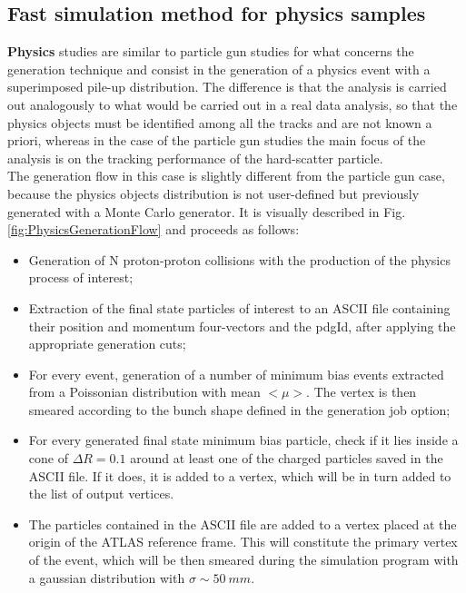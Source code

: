 \documentclass[a4paper,twoside,12pt]{article}
\begin{document}
\subsection{Fast simulation method for physics samples}\label{subsec:physicsSimulation}

\textbf{Physics} studies are similar to particle gun studies for what concerns the generation technique and 
consist in the generation of a physics event with a superimposed pile-up distribution. The
difference is that the analysis is carried out analogously to what would be carried out
in a real data analysis, so that the physics objects must be identified among all the tracks
and are not known a priori, whereas in the case of the particle gun studies the main focus
of the analysis is on the tracking performance of the hard-scatter particle.\\

The generation flow in this case is slightly different from the particle gun case, because 
the physics objects distribution is not user-defined but previously generated with a Monte
Carlo generator. It is visually described in Fig.\ref{fig:PhysicsGenerationFlow} and proceeds as follows:\\

\begin{itemize}
\item Generation of N proton-proton collisions with the production of the physics process of
interest;
\item Extraction of the final state particles of interest to an ASCII file containing their
position and momentum four-vectors and the pdgId, after applying the appropriate generation cuts;
\item For every event, generation of a number of minimum bias events extracted from a Poissonian distribution with mean $<\mu>$. The vertex is then smeared according to the
bunch shape defined in the generation job option;
\item For every generated final state minimum bias particle, check if it lies inside a cone of 
$\Delta R = 0.1$ around at least one of the charged particles saved in the ASCII file. If it does,
it is added to a vertex, which will be in turn added to the list of output vertices.
\item The particles contained in the ASCII file are added to a vertex placed at the origin
of the ATLAS reference frame. This will constitute the primary vertex of the event, which
will be then smeared during the simulation program with a gaussian distribution with $\sigma \sim 50\ mm$.

\end{itemize}
\end{document}
